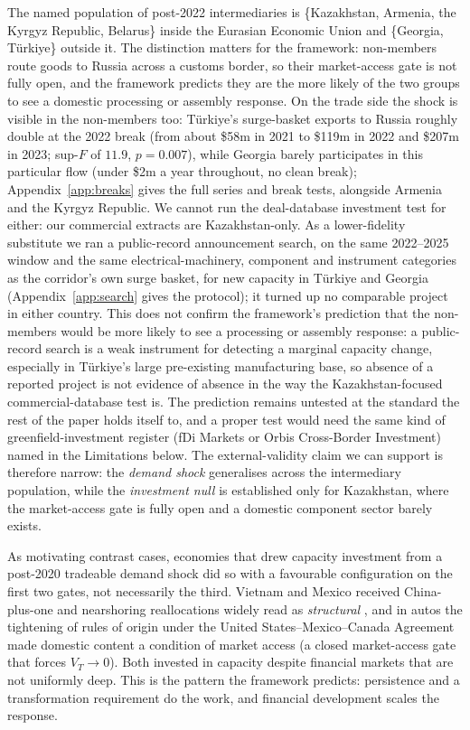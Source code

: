 \documentclass[12pt]{article}
\begin{document}
The named population of post-2022 intermediaries is
\{Kazakhstan, Armenia, the Kyrgyz Republic, Belarus\} inside the Eurasian Economic Union and
\{Georgia, T\"urkiye\} outside it. The distinction matters for the framework: non-members
route goods to Russia across a customs border, so their market-access gate is not fully open,
and the framework predicts they are the more likely of the two groups to see a domestic
processing or assembly response. On the trade side the shock is visible in the non-members
too: T\"urkiye's surge-basket exports to Russia roughly double at the 2022 break (from about
\$58m in 2021 to \$119m in 2022 and \$207m in 2023; sup-$F$ of $11.9$, $p = 0.007$), while
Georgia barely participates in this particular flow (under \$2m a year throughout, no clean
break); Appendix~\ref{app:breaks} gives the full series and break tests, alongside Armenia and
the Kyrgyz Republic. We cannot run the deal-database investment test for either: our
commercial extracts are Kazakhstan-only. As a lower-fidelity substitute we ran a public-record
announcement search, on the same 2022--2025 window and the same electrical-machinery,
component and instrument categories as the corridor's own surge basket, for new capacity in
T\"urkiye and Georgia (Appendix~\ref{app:search} gives the protocol); it turned up no comparable project in either country. This does not
confirm the framework's prediction that the non-members would be more likely to see a
processing or assembly response: a public-record search is a weak instrument for detecting a
marginal capacity change, especially in T\"urkiye's large pre-existing manufacturing base, so
absence of a reported project is not evidence of absence in the way the Kazakhstan-focused
commercial-database test is. The prediction remains untested at the standard the rest of the
paper holds itself to, and a proper test would need the same kind of greenfield-investment
register (fDi Markets or Orbis Cross-Border Investment) named in the Limitations below. The
external-validity claim we can support is therefore
narrow: the \emph{demand shock} generalises across the intermediary population, while the
\emph{investment null} is established only for Kazakhstan, where the market-access gate is
fully open and a domestic component sector barely exists.

As motivating contrast cases, economies that drew capacity investment from a post-2020
tradeable demand shock did so with a favourable configuration on the first two gates, not
necessarily the third. Vietnam and Mexico received China-plus-one and nearshoring
reallocations widely read as \emph{structural} \citep[e.g.][]{juhaszlanerodrik2024}, and in
autos the tightening of rules of origin under the United States--Mexico--Canada Agreement made
domestic content a condition of market access (a closed market-access gate that forces
$V_T \to 0$). Both invested in capacity despite financial markets that are not uniformly deep. This is the
pattern the framework predicts: persistence and a transformation requirement do the work, and
financial development scales the response.
\end{document}
